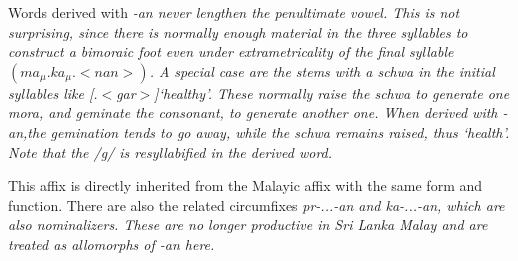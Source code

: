 Words derived with \em -an \em never lengthen the penultimate vowel. This is not surprising, since there is normally enough material in the three syllables to construct a bimoraic foot even under extrametricality of the final syllable $(ma_{\mu}.ka_{\mu}.<nan>)$. A special case are the stems with a schwa in the initial syllables like [.$<$gar$>$]`healthy'. These normally raise the schwa to generate one mora, and geminate the consonant, to generate another one. When derived with \em -an,\em the gemination tends to go away, while the schwa remains raised, thus `health'. Note that the /g/ is resyllabified in the derived word.
% 
% 
% 
% 
% 

This affix is directly inherited from the Malayic affix with the same form and function. There are also the related circumfixes \em p\E r-...-an \em and \em ka-...-an\em, which are also nominalizers. These are no longer productive in Sri Lanka Malay and are treated as allomorphs of \em -an \em here.  




